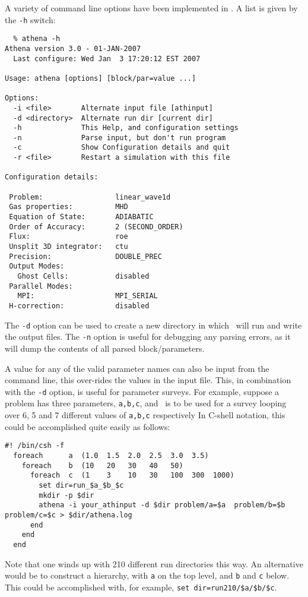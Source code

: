 A variety of command line options have been implemented in \ath.
A list is given by the {\tt -h} switch:
\footnotesize
\begin{verbatim}
  % athena -h
Athena version 3.0 - 01-JAN-2007
  Last configure: Wed Jan  3 17:20:12 EST 2007

Usage: athena [options] [block/par=value ...]

Options:
  -i <file>       Alternate input file [athinput]
  -d <directory>  Alternate run dir [current dir]
  -h              This Help, and configuration settings
  -n              Parse input, but don't run program
  -c              Show Configuration details and quit
  -r <file>       Restart a simulation with this file

Configuration details:

 Problem:                 linear_wave1d
 Gas properties:          MHD
 Equation of State:       ADIABATIC
 Order of Accuracy:       2 (SECOND_ORDER)
 Flux:                    roe
 Unsplit 3D integrator:   ctu
 Precision:               DOUBLE_PREC
 Output Modes:
   Ghost Cells:           disabled
 Parallel Modes:
   MPI:                   MPI_SERIAL
 H-correction:            disabled
\end{verbatim}
\normalsize
The {\tt -d} option can be used to create a new directory in which
\ath\ will run and write the output files.  The {\tt -n} option is
useful for debugging any parsing errors, as it will dump the contents
of all parsed block/parameters.

A value for any of the valid parameter names can also be input from
the command line, this over-rides the values in the input file.
This, in combination with the {\tt -d} option, is
useful for parameter surveys.  For example, 
suppose a problem has three parameters, {\tt a,b,c}, and \ath\
is to be used for a survey looping over
6, 5 and 7 different values of  {\tt a,b,c} respectively
In C-shell notation, this could be accomplished quite easily as follows:
\footnotesize
\begin{verbatim}
#! /bin/csh -f
  foreach      a  (1.0  1.5  2.0  2.5  3.0  3.5)
    foreach    b  (10   20   30   40   50)
      foreach  c  (1    3    10   30   100  300  1000)
        set dir=run_$a_$b_$c
        mkdir -p $dir
        athena -i your_athinput -d $dir problem/a=$a  problem/b=$b  problem/c=$c > $dir/athena.log
      end
    end
  end
\end{verbatim}   %
\normalsize
Note that one winds up with 210 different run directories this way.
An alternative
would be to construct a hierarchy, with {\tt a} on the top level, and
{\tt b} and {\tt c} below. This could be accomplished with, for example,
{\tt set dir=run210/\$a/\$b/\$c}.

